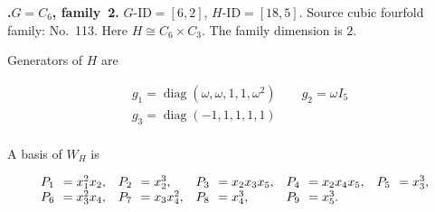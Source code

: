 \documentclass[12pt]{amsart}
\makeatletter
\numberwithin{equation}{section}
\theoremstyle{plain}
\theoremstyle{definition}
\theoremstyle{remark}
\DeclareMathOperator{\diag}{diag}
\newcommand{\PBasisLabel}[1]{\mathrlap{P_{#1}}\phantom{P_{99}}}
\newenvironment{SecEightAlignedBasis}[1]{%
  \begingroup\renewcommand{\arraystretch}{1.18}%
  \[\begin{array}{@{}#1@{}}%
}{\end{array}\]\endgroup}
\newenvironment{familydisplay}{%
  \begingroup
  \setlength{\arraycolsep}{1.35pt}%
  \renewcommand{\arraystretch}{0.96}%
  \setlength{\jot}{2pt}%
}{\endgroup}
\makeatother
\begin{document}
\par{}\medskip\noindent\textbf{.\enspace $G=C_6$, family~2.}\label{fam:threefold-no-28}
$G\text{-ID}=[6,2]$, $H\text{-ID}=[18,5]$.
Source cubic fourfold family: No.~113.  Here
$H\cong C_6\times C_3$.
The family dimension is $2$.
\par\smallskip\noindent Generators of $H$ are\par\nopagebreak
\begin{familydisplay}
\begin{align*}
&g_{1}=\diag(\omega,\omega,1,1,\omega^2)
\qquad g_{2}=\omega I_5\\
&g_{3}=\diag(-1,1,1,1,1)\\
\end{align*}
\end{familydisplay}
\par\smallskip\noindent A basis of $W_H$ is\par\nopagebreak
\begin{familydisplay}
\begin{SecEightAlignedBasis}{l@{\quad}l@{\quad}l@{\quad}l@{\quad}l}
\PBasisLabel{1}=x_{1}^{2}x_{2}, & \PBasisLabel{2}=x_{2}^{3}, & \PBasisLabel{3}=x_{2}x_{3}x_{5}, & \PBasisLabel{4}=x_{2}x_{4}x_{5}, & \PBasisLabel{5}=x_{3}^{3},\\
\PBasisLabel{6}=x_{3}^{2}x_{4}, & \PBasisLabel{7}=x_{3}x_{4}^{2}, & \PBasisLabel{8}=x_{4}^{3}, & \multicolumn{2}{@{}l@{}}{\PBasisLabel{9}=x_{5}^{3}.}
\end{SecEightAlignedBasis}
\end{familydisplay}
\end{document}
